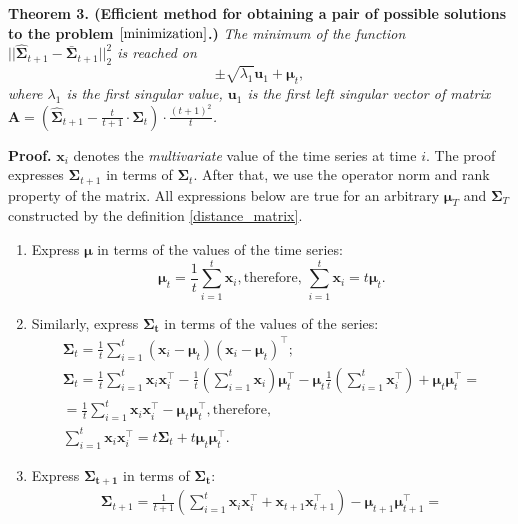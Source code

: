 \documentclass[12pt]{article}
\begin{document}
{\textbf{Theorem 3. (Efficient method for obtaining a pair of possible solutions to the problem $\eqref{minimization}$.)} \emph{ The minimum of the function $||\hat{\mathbf{\Sigma}}_{t+1} - \bar{\mathbf{\Sigma}}_{t+1}||_2^2$ is reached on \[\pm\sqrt{\lambda_1} \mathbf{u}_1 + \boldsymbol{\mu}_t,\] where $\lambda_1$ is the first singular value, $\mathbf{u}_1$ is the first left singular vector of matrix\\ $\mathbf{A}=\left(\hat{\mathbf{\Sigma}}_{t+1} - \frac{t}{t+1} \cdot \mathbf{\Sigma}_t \right) \cdot \frac{(t+1)^2}{t}$.}

\textbf{Proof.} $\mathbf{x}_i$ denotes the \emph{multivariate} value of the time series at time $i$. The proof expresses $\mathbf{\Sigma}_{t+1}$ in terms of $\mathbf{\Sigma}_t$. After that, we use the operator norm and rank property of the matrix. All expressions below are true for an arbitrary $\boldsymbol{\mu}_T$ and $\mathbf{\Sigma}_T$ constructed by the definition \eqref{distance_matrix}.
\begin{enumerate}
	\item Express $\boldsymbol{\mu}$ in terms of the values of the time series: \[\boldsymbol{\mu}_t = \frac{1}{t} \sum_{i=1}^{t} \mathbf{x}_i, \text{therefore, } \sum_{i=1}^{t} \mathbf{x}_i = t \boldsymbol{\mu}_t.\]
	\item Similarly, express $\mathbf{\Sigma_t}$ in terms of the values of the series:
		\begin{gather*}
		\mathbf{\Sigma}_t = \frac{1}{t} \sum_{i=1}^{t} (\mathbf{x}_i-\boldsymbol{\mu}_t)(\mathbf{x}_i-\boldsymbol{\mu}_t)^\intercal;\\
		\mathbf{\Sigma}_t = \frac{1}{t} \sum_{i=1}^{t} \mathbf{x}_i \mathbf{x}_i^\intercal - \frac{1}{t} \left( \sum_{i=1}^{t} \mathbf{x}_i\right) \boldsymbol{\mu}_t^\intercal - \boldsymbol{\mu}_t \frac{1}{t} \left( \sum_{i=1}^{t} \mathbf{x}_i^\intercal\right) + \boldsymbol{\mu}_t \boldsymbol{\mu}_t^\intercal =\\= \frac{1}{t} \sum_{i=1}^{t} \mathbf{x}_i \mathbf{x}_i^\intercal - \boldsymbol{\mu}_t \boldsymbol{\mu}_t^\intercal, \text{therefore, }\\
		\sum_{i=1}^{t} \mathbf{x}_i \mathbf{x}_i^\intercal = t \mathbf{\Sigma}_t + t \boldsymbol{\mu}_t \boldsymbol{\mu}_t^\intercal.
		\end{gather*}
	\item Express $\mathbf{\Sigma_{t+1}}$ in terms of $\mathbf{\Sigma_t}$:
	\begin{gather*}
		\mathbf{\Sigma}_{t+1} = \frac{1}{t+1} \left(\sum_{i=1}^{t} \mathbf{x}_i \mathbf{x}_i^\intercal + \mathbf{x}_{t+1} \mathbf{x}_{t+1}^\intercal \right) - \boldsymbol{\mu}_{t+1} \boldsymbol{\mu}_{t+1}^\intercal = \\

\end{gather*}
\end{enumerate}}
\end{document}
